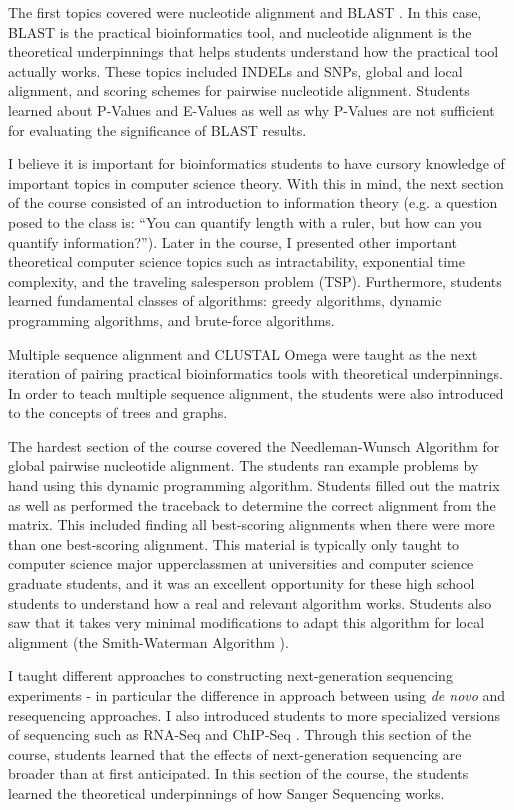 \documentclass{report}
\begin{document}
The first topics covered were nucleotide alignment and BLAST  \cite{altschul1990basic}. In this case, BLAST is the practical bioinformatics tool, and nucleotide alignment is the theoretical underpinnings that helps students understand how the practical tool actually works. These topics included INDELs and SNPs, global and local alignment, and scoring schemes for pairwise nucleotide alignment. Students learned about P-Values and E-Values as well as why P-Values are not sufficient for evaluating the significance of BLAST results. 

I believe it is important for bioinformatics students to have cursory knowledge of important topics in computer science theory. With this in mind, the next section of the course consisted of an introduction to information theory (e.g. a question posed to the class is: ``You can quantify length with a ruler, but how can you quantify information?''). Later in the course, I presented other important theoretical computer science topics such as intractability, exponential time complexity, and the traveling salesperson problem (TSP). Furthermore, students learned fundamental classes of algorithms: greedy algorithms, dynamic programming algorithms, and brute-force algorithms. 

Multiple sequence alignment and CLUSTAL Omega \cite{sievers2011fast} were taught as the next iteration of pairing practical bioinformatics tools with theoretical underpinnings. In order to teach multiple sequence alignment, the students were also introduced to the concepts of trees and graphs.

The hardest section of the course covered the Needleman-Wunsch Algorithm \cite{needleman1970general} for global pairwise nucleotide alignment. The students ran example problems by hand using this dynamic programming algorithm. Students filled out the matrix as well as performed the traceback to determine the correct alignment from the matrix. This included finding all best-scoring alignments when there were more than one best-scoring alignment. This material is typically only taught to computer science major upperclassmen at universities and computer science graduate students, and it was an excellent opportunity for these high school students to understand how a real and relevant algorithm works. Students also saw that it takes very minimal modifications to adapt this algorithm for local alignment (the Smith-Waterman Algorithm \cite{smith1981identification}).

I taught different approaches to constructing next-generation sequencing experiments - in particular the difference in approach between using \emph{de novo} and resequencing approaches. I also introduced students to more specialized versions of sequencing such as RNA-Seq \cite{nagalakshmi2008transcriptional} and ChIP-Seq \cite{johnson2007genome}. Through this section of the course, students learned that the effects of next-generation sequencing are broader than at first anticipated. In this section of the course, the students learned the theoretical underpinnings of how Sanger Sequencing \cite{sanger1977dna} works.
\end{document}
